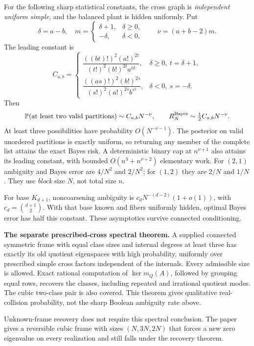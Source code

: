 \documentclass[10pt]{article}
\newcommand{\Prob}{\mathbb P}
\begin{document}
For the following sharp statistical constants, the cross graph is
\emph{independent uniform simple}, and the balanced plant is hidden
uniformly. Put
\[
 \delta=a-b,\quad
 m=\begin{cases}\delta+1,&\delta\ge0,\\-\delta,&\delta<0,\end{cases}
 \qquad\nu=(a+b-2)m.
\]
The leading constant is
\[
 C_{a,b}=\begin{cases}
 \dfrac{((bt)!)^2(a!)^{2t}}{(t!)^2(b!)^{2t}a^{t\delta}},
       &\delta\ge0,\ t=\delta+1,\\[4pt]
 \dfrac{((as)!)^2(b!)^{2s}}{(s!)^2(a!)^{2s}b^{s^2}},
       &\delta<0,\ s=-\delta.
 \end{cases}
\]
Then
\[
 \Prob(\text{at least two valid partitions})\sim C_{a,b}N^{-\nu},
 \qquad R_N^{\rm Bayes}\sim\tfrac12C_{a,b}N^{-\nu}.
\]
At least three possibilities have probability $O(N^{-\nu-1})$.
The posterior on valid unordered partitions is exactly uniform, so
returning any member of the complete list attains the exact Bayes
risk. A deterministic binary cap at $n^{\nu+1}$ also attains its
leading constant, with bounded $O(n^3+n^{\nu+2})$ elementary work.
For $(2,1)$ ambiguity and Bayes error are $4/N^2$ and $2/N^2$;
for $(1,2)$ they are $2/N$ and $1/N$.
They use \emph{block} size $N$, not total size $n$.

For base $K_{d+1}$, noncoarsening ambiguity is
$c_dN^{-(d-2)}(1+o(1))$, with $c_d=\binom{d+1}{2}$.
With that base known and fibers
uniformly hidden, optimal Bayes error has half this constant.
These asymptotics survive connected conditioning.

\textbf{The separate prescribed-cross spectral theorem.}
A supplied connected symmetric frame with equal class sizes and
internal degrees at least three has exactly its old quotient
eigenspaces with high probability, uniformly over prescribed simple
cross factors independent of the internals. Every admissible size is
allowed. Exact rational computation of $\ker m_Q(A)$, followed by
grouping equal rows, recovers the classes, including repeated and
irrational quotient modes. The cubic two-class pair is also covered.
This theorem gives qualitative real-collision probability, not the
sharp Boolean ambiguity rate above.

Unknown-frame recovery does not require this spectral conclusion.
The paper gives a reversible cubic frame with sizes $(N,3N,2N)$
that forces a new zero eigenvalue on every realization and still
falls under the recovery theorem.
\end{document}
